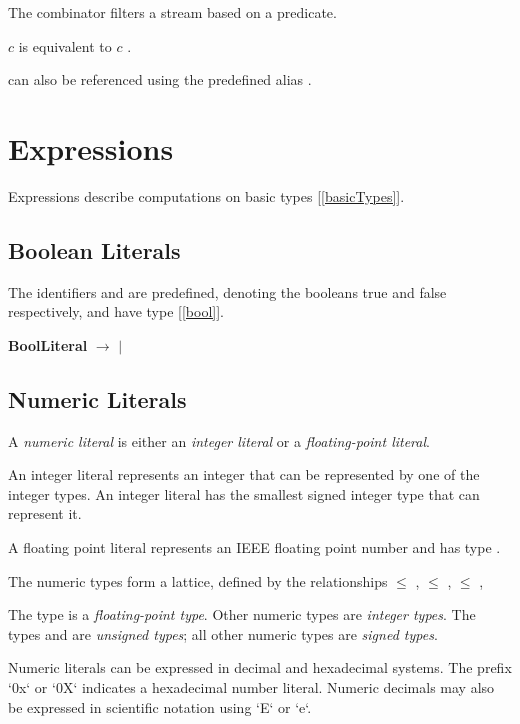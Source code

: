 \documentclass{article}
\begin{document}
The \WHERE{} combinator filters a stream based on a predicate.

\WHERE{} $c$ is equivalent to \IF{} $c$ \IDENTITY{} \ELSE{} \DROP.

\WHERE{} can also be referenced using the predefined alias \FILTER.


\section{Expressions}
\label{expressions}

Expressions describe computations on basic types [\ref{basicTypes}].

\subsection{Boolean Literals}
\label{booleanLiterals}

The identifiers \TRUE{} and \FALSE{} are predefined,  denoting the booleans true and false respectively, and have type \BOOL{} [\ref{bool}].

{\bf BoolLiteral} $\rightarrow$ \TRUE{} $|$ \FALSE{}

\subsection{Numeric Literals}
\label{numericLiterals}

A {\em numeric literal} is either an {\em integer literal} or a {\em floating-point literal}.

An integer literal represents an integer that can be represented by one of the integer types.
An integer literal has the smallest signed integer type that can represent it.

A floating point literal represents an IEEE floating point number and has type \FSIXTYFOUR.

The numeric types form a lattice, defined by the relationships \UINTTHIRTYTWO $\le$ \UINTSIXTYFOUR,   \INTTHIRTYTWO $\le$ \INTSIXTYFOUR,   \INTTHIRTYTWO $\le$ \FSIXTYFOUR{},

The type \FSIXTYFOUR{} is a {\em floating-point type}. Other numeric types are {\em integer types}. The types \UINTTHIRTYTWO{} and \UINTSIXTYFOUR{} are {\em unsigned types}; all other numeric types are {\em signed types}.

Numeric literals can be expressed in decimal and hexadecimal systems. The prefix `0x` or `0X` indicates a hexadecimal number literal. Numeric decimals may also be expressed in scientific notation using `E` or `e`.
\end{document}
